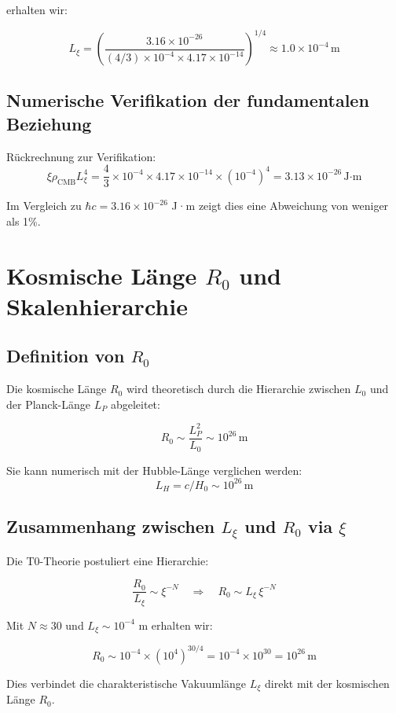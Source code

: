 \documentclass[12pt,a4paper]{article}
\numberwithin{equation}{section}
\begin{document}
	erhalten wir:
	
	\[
	L_\xi = \left(\frac{3.16 \times 10^{-26}}{(4/3) \times 10^{-4} \times 4.17 \times 10^{-14}}\right)^{1/4} \approx 1.0 \times 10^{-4}\,\text{m}
	\]
	
	\subsection{Numerische Verifikation der fundamentalen Beziehung}
	
	Rückrechnung zur Verifikation:
	\[
	\xi \rho_{\text{CMB}} L_\xi^4 = \frac{4}{3} \times 10^{-4} \times 4.17 \times 10^{-14} \times (10^{-4})^4 = 3.13 \times 10^{-26}\,\text{J·m}
	\]
	
	Im Vergleich zu $\hbar c = 3.16 \times 10^{-26}$ J·m zeigt dies eine Abweichung von weniger als 1\%.
	
	\section{Kosmische Länge $R_0$ und Skalenhierarchie}
	
	\subsection{Definition von $R_0$}
	
	Die kosmische Länge $R_0$ wird theoretisch durch die Hierarchie zwischen $L_0$ und der Planck-Länge $L_P$ abgeleitet:
	
	\[
	R_0 \sim \frac{L_P^2}{L_0} \sim 10^{26}\,\text{m}
	\]
	
	Sie kann numerisch mit der Hubble-Länge verglichen werden:
	\[
	L_H = c / H_0 \sim 10^{26}\,\text{m}
	\]
	
	\subsection{Zusammenhang zwischen $L_\xi$ und $R_0$ via $\xi$}
	
	Die T0-Theorie postuliert eine Hierarchie:
	
	\[
	\frac{R_0}{L_\xi} \sim \xi^{-N} \quad \Rightarrow \quad R_0 \sim L_\xi \, \xi^{-N}
	\]
	
	Mit $N \approx 30$ und $L_\xi \sim 10^{-4}$ m erhalten wir:
	
	\[
	R_0 \sim 10^{-4} \times (10^4)^{30/4} = 10^{-4} \times 10^{30} = 10^{26}\,\text{m}
	\]
	
	Dies verbindet die charakteristische Vakuumlänge $L_\xi$ direkt mit der kosmischen Länge $R_0$.
	
\end{document}
